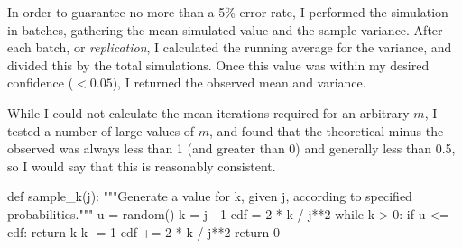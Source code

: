 \begin{solution}
\begin{enumerate}
            In order to guarantee no more than a 5\% error rate, I
            performed the simulation in batches, gathering the mean
            simulated value and the sample variance. After each batch,
            or \emph{replication}, I calculated the running average for
            the variance, and divided this by the total simulations.
            Once this value was within my desired confidence ($<0.05$),
            I returned the observed mean and variance.

            While I could not calculate the mean iterations required for
            an arbitrary $m$, I tested a number of large values of $m$,
            and found that the theoretical minus the observed was always
            less than 1 (and greater than 0) and generally less than
            0.5, so I would say that this is reasonably consistent.

            \newpage
            \begin{python}

def sample_k(j):
    """Generate a value for k, given j, according to specified
    probabilities."""
    u = random()
    k = j - 1
    cdf = 2 * k / j**2
    while k > 0:
        if u <= cdf:
            return k
        k -= 1
        cdf += 2 * k / j**2
    return 0
            \end{python}

    \end{enumerate}
\end{solution}
